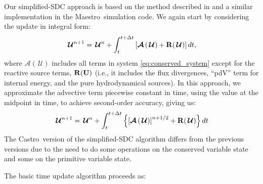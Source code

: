 \documentclass[times,modern]{aastex63}
\newcommand{\castro}{{\sf Castro}}
\newcommand{\maestro}{{\sf Maestro}}
\newcommand{\Ub}{\mathbf{U}}
\newcommand{\Uc}{{\,\bm{\mathcal{U}}}}
\newcommand{\Rb}{{\bf R}}
\newcommand{\Adv}[1]{{\left [\boldsymbol{\mathcal{A}} \left(#1\right)\right]}}
\newcommand{\Advs}[1]{\boldsymbol{\mathcal{A}} \left(#1\right)}
\begin{document}
Our simplified-SDC approach is based on the method described in \citet{SDC-old} and
a similar implementation in the \maestro\ simulation code.
We again start by considering the update
in integral form:
\begin{equation}
\Uc^{n+1} = \Uc^n + \int_t^{t+\Delta t} \left [ \Advs{\Uc} + \Rb(\Uc) \right ] dt,
\end{equation}
where $\Advs{\Uc}$ includes all terms in system
\ref{eq:conserved_system} except for the reactive source terms,
$\Rb(\Ub)$ (i.e., it includes the flux divergences, ``pdV'' term for
internal energy, and the pure hydrodynamical sources).  In this approach, we 
approximate the advective term
piecewise constant in time, using the value at the midpoint in time,
to achieve second-order accuracy, giving us:
\begin{equation}
\label{eq:integral:simplesdc}
\Uc^{n+1} = \Uc^n + \int_t^{t+\Delta t} \left \{ \Adv{\Uc}^{n+1/2} + \Rb(\Uc) \right \} dt
\end{equation}
The \castro\ version of the simplified-SDC algorithm
differs from the previous versions due to the need to do some operations
on the conserved variable state and some on the primitive variable
state. 

The basic time update algorithm proceeds as:
\end{document}
